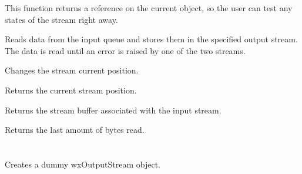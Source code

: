 This function returns a reference on the current object, so the user can test
any states of the stream right away.


Reads data from the input queue and stores them in the specified output stream.
The data is read until an error is raised by one of the two streams.



Changes the stream current position.


Returns the current stream position.



Returns the stream buffer associated with the input stream.


Returns the last amount of bytes read.


\section{}\label{wxoutputstream}







Creates a dummy wxOutputStream object.


